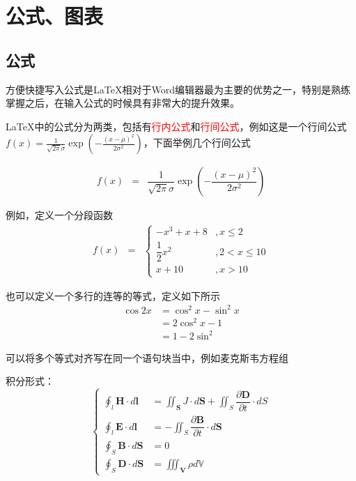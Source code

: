 \newcommand{\red}[1]{{\textcolor{red}{#1}}}%
\newcommand{\argmin}{\mathop{\mathrm{argmin}}\limits}
\newcommand{\argmax}{\mathop{\mathrm{argmax}}\limits}
\chapter{公式、图表}
\section{公式}

方便快捷写入公式是\LaTeX 相对于Word编辑器最为主要的优势之一，特别是熟练掌握之后，在输入公式的时候具有非常大的提升效果。


\LaTeX 中的公式分为两类，包括有\red{行内公式}和\red{行间公式}，例如这是一个行间公式$f(x)=\frac{1}{\sqrt{2\pi}\sigma}\exp\left(-\frac{(x-\mu)^{2}}{2\sigma^{2}}\right)$，下面举例几个行间公式

\begin{eqnarray}
    f(x)&=&\dfrac{1}{\sqrt{2\pi}\sigma}\exp\left(-\dfrac{(x-\mu)^{2}}{2\sigma^{2}}\right)    
\end{eqnarray}

例如，定义一个分段函数
\begin{eqnarray}
    f(x)&=&\begin{cases}
        -x^{3}+x+8&,x\leq{2}\\
        \dfrac{1}{2}x^{2}&,2<x\leq{10}\\
        x+10&,x>10
    \end{cases}
\end{eqnarray}

也可以定义一个多行的连等的等式，定义如下所示
\begin{eqnarray}
    \cos{2x}&=\cos^{2}x-\sin^{2}x\\
        &=2\cos^{2}x-1\\
        &=1-2\sin^{2}
\end{eqnarray}

可以将多个等式对齐写在同一个语句块当中，例如麦克斯韦方程组

积分形式：
\begin{equation}
    \begin{cases}
        \displaystyle\oint_{l}\mathbf{H}\cdot{d}\mathbf{l}&=\displaystyle\iint_\mathbf{S}J\cdot{d}\mathbf{S}+\displaystyle\iint_{S}\dfrac{\partial\mathbf{D}}{\partial{t}}\cdot{dS}\\
        \displaystyle\oint_{l}\mathbf{E}\cdot{d}\mathbf{l}&=-\displaystyle\iint_{S}\dfrac{\partial\mathbf{B}}{\partial{t}}\cdot{d}\mathbf{S}\\
        \displaystyle\oint_{S}\mathbf{B}\cdot{d}\mathbf{S}&=0\\
        \displaystyle\oint_{S}\mathbf{D}\cdot{d}\mathbf{S}&=\displaystyle\iiint_\mathbf{V}\rho{d}\mathbb{V}
    \end{cases}
\end{equation}


